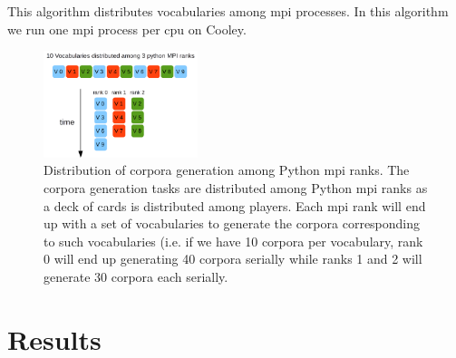 \documentclass[10pt,journal,compsoc]{IEEEtran}
\begin{document}
\begin{algorithm}
	\caption{This algorithm distributes vocabularies among \gls{mpi} processes. In this algorithm we run one \gls{mpi} process per \gls{cpu} on Cooley.}
\label{corpora_generation_parallelization}
\begin{algorithmic}[1]
			\ENDFOR
		\ENDIF
	\ENDFOR
\end{algorithmic}
\end{algorithm}

\begin{figure}[h!]
    \centering
    \includegraphics[width=0.4\textwidth]{CorporaGenerationParallelization.png}
    \caption{Distribution of corpora generation among Python \gls{mpi} ranks. The corpora generation tasks are distributed among Python \gls{mpi} ranks as a deck of cards is distributed among players. Each \gls{mpi} rank will end up with a set of vocabularies to generate the corpora corresponding to such vocabularies (i.e. if we have 10 corpora per vocabulary, rank 0 will end up generating 40 corpora serially while ranks 1 and 2 will generate 30 corpora each serially.}
    \label{fig:CorporaGenerationParallelization}
\end{figure}



















\section{Results}
\end{document}
